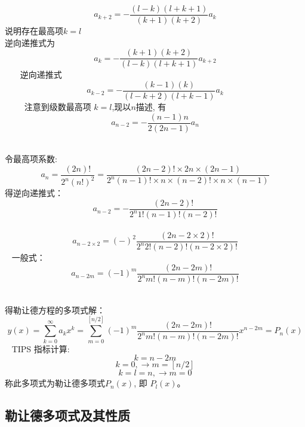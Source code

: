 	{}
	\begin{equation*}
		a_{k+2}=-\frac{(l-k)(l+k+1)}{(k+1)(k+2) }a_{k}
	\end{equation*}
	说明存在最高项$k=l$ \\
	逆向递推式为 
	\begin{equation*}
		a_{k}=-\frac{(k+1)(k+2) }{(l-k)(l+k+1)}a_{k+2}
	\end{equation*}	   
	{\Bullet}逆向递推式
	\begin{equation*}
		a_{k-2}=-\frac{(k-1)(k) }{(l-k+2)(l+k-1)}a_{k}
	\end{equation*}	    
	注意到级数最高项 $k=l$,现以$n$描述, 有 
	\begin{equation*}
		a_{n-2}=-\frac{(n-1) n}{2(2n-1)} a_{n}
	\end{equation*}	 
	


	令最高项系数: \[a_n=\frac{(2n)!}{2^n (n!)^2} = \frac{(2n-2)!\times 2n \times (2n-1)}{2^n (n-1)!\times n \times (n-2)!\times n \times (n-1)  } \]
	得逆向递推式：
	\begin{equation*}
		a_{n-2}=-\frac{(2 n-2) !}{2^{n} 1! (n-1) !(n-2) !}
	\end{equation*}	 
	\begin{equation*}
		a_{n-2\times2}=(-)^2\frac{(2 n-2\times2) !}{2^{n} 2! (n-2) !(n-2\times2) !}
	\end{equation*}	 
	一般式：
	\begin{equation*}
		a_{n-2 m}=(-1)^{m} \frac{(2 n-2 m) !}{2^{n} m !(n-m) !(n-2 m) !}
	\end{equation*}	 
	


	得勒让德方程的多项式解：
	\begin{equation*}
		y(x)=\sum_{k=0}^{\infty}a_k x^k =\sum_{m=0}^{[n / 2]}(-1)^{m} \frac{(2 n-2 m) !}{2^{n} m !(n-m) !(n-2 m) !} x^{n-2 m}=P_{n}(x)
	\end{equation*}	 
	TIPS 指标计算:
	\[ k=n-2m \]
	\[k=0, \to  m=[n/2] \]
	\[k=l=n, \to m=0 \]
	称此多项式为勒让德多项式$P_n(x)$, 即 $P_l(x)$。
	

\subsection{勒让德多项式及其性质}


